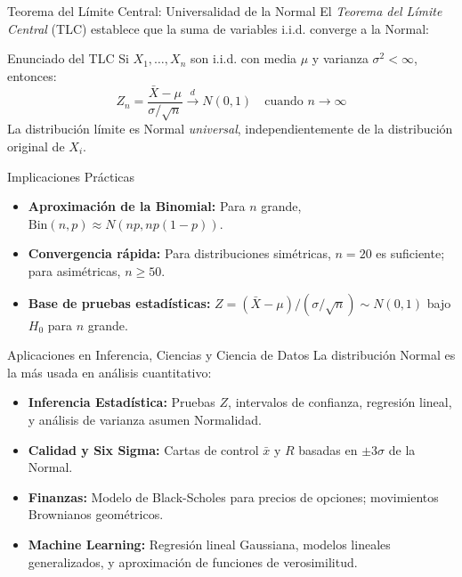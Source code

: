 \documentclass[10pt, aspectratio=169]{beamer}
\begin{document}
\begin{frame}{Teorema del Límite Central: Universalidad de la Normal}
  \footnotesize
  El \emph{Teorema del Límite Central} (TLC) establece que la suma de variables i.i.d. converge a la Normal: \pause

  \vspace{0.1cm}
  \begin{block}{Enunciado del TLC}
    Si $X_{1}, \dots, X_{n}$ son i.i.d. con media $\mu$ y varianza $\sigma^{2} < \infty$, entonces:
    $$Z_{n} = \dfrac{\bar{X} - \mu}{\sigma/\sqrt{n}} \xrightarrow{d} N(0, 1) \quad \text{cuando } n \to \infty$$
    La distribución límite es Normal \emph{universal}, independientemente de la distribución original de $X_{i}$.
  \end{block}

  \vspace{0.1cm}
  \pause
  \begin{alertblock}{Implicaciones Prácticas}
    \begin{itemize}\itemsep=0.05cm
      \item \textbf{Aproximación de la Binomial:} Para $n$ grande, $\text{Bin}(n, p) \approx N(np, np(1-p))$.
      \item \textbf{Convergencia rápida:} Para distribuciones simétricas, $n = 20$ es suficiente; para asimétricas, $n \ge 50$.
      \item \textbf{Base de pruebas estadísticas:} $Z = (\bar{X} - \mu)/(\sigma/\sqrt{n}) \sim N(0, 1)$ bajo $H_{0}$ para $n$ grande.
    \end{itemize}
  \end{alertblock}
\end{frame}

\begin{frame}{Aplicaciones en Inferencia, Ciencias y Ciencia de Datos}
  \footnotesize
  La distribución Normal es la más usada en análisis cuantitativo: \pause

  \vspace{0.15cm}
  \begin{itemize}\itemsep=0.12cm
    \item \textbf{Inferencia Estadística:} Pruebas $Z$, intervalos de confianza, regresión lineal, y análisis de varianza asumen Normalidad. \pause
    \item \textbf{Calidad y Six Sigma:} Cartas de control $\bar{x}$ y $R$ basadas en $\pm 3\sigma$ de la Normal. \pause
    \item \textbf{Finanzas:} Modelo de Black-Scholes para precios de opciones; movimientos Brownianos geométricos. \pause
    \item \textbf{Machine Learning:} Regresión lineal Gaussiana, modelos lineales generalizados, y aproximación de funciones de verosimilitud.
  \end{itemize}
\end{frame}
\end{document}

